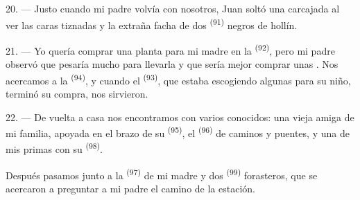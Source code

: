 20. --- Justo cuando mi padre volvía con nosotros, Juan soltó una carcajada
al ver las caras tiznadas y la extraña facha de dos
 \textsuperscript{(91)} negros de hollín.

21. --- Yo quería comprar una planta para mi madre en la 
\textsuperscript{(92)}, pero mi padre observó que pesaría mucho para llevarla y que
sería mejor comprar unas . Nos acercamos a la
 \textsuperscript{(94)}, y cuando el 
\textsuperscript{(93)}, que estaba escogiendo algunas para su niño, terminó su
compra, nos sirvieron.

22. --- De vuelta a casa nos encontramos con varios conocidos: una vieja
amiga de mi familia, apoyada en el brazo de su 
\textsuperscript{(95)}, el  \textsuperscript{(96)} de caminos y puentes, y
una de mis primas con su  \textsuperscript{(98)}.

Después pasamos junto a la  \textsuperscript{(97)} de mi madre y dos
 \textsuperscript{(99)} forasteros, que se acercaron a preguntar a mi
padre el camino de la estación.
\VUsaut{6.0mm}
\VUfilet{22mm}
